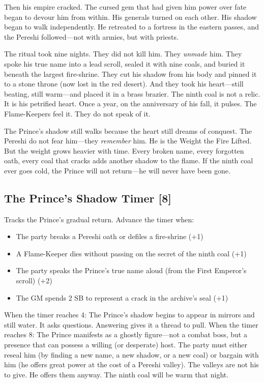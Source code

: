 Then his empire cracked. The cursed gem that had given him power over fate began to devour him from within. His generals turned on each other. His shadow began to walk independently. He retreated to a fortress in the eastern passes, and the Pereshi followed---not with armies, but with priests.

The ritual took nine nights. They did not kill him. They \textit{unmade} him. They spoke his true name into a lead scroll, sealed it with nine coals, and buried it beneath the largest fire-shrine. They cut his shadow from his body and pinned it to a stone throne (now lost in the red desert). And they took his heart---still beating, still warm---and placed it in a brass brazier. The ninth coal is not a relic. It is his petrified heart. Once a year, on the anniversary of his fall, it pulses. The Flame-Keepers feel it. They do not speak of it.

The Prince's shadow still walks because the heart still dreams of conquest. The Pereshi do not fear him---they \textit{remember} him. He is the Weight the Fire Lifted. But the weight grows heavier with time. Every broken name, every forgotten oath, every coal that cracks adds another shadow to the flame. If the ninth coal ever goes cold, the Prince will not return---he will never have been gone.

\subsection*{The Prince's Shadow Timer [8]}
Tracks the Prince's gradual return. Advance the timer when:
\begin{itemize}
  \item The party breaks a Pereshi oath or defiles a fire-shrine (+1)
  \item A Flame-Keeper dies without passing on the secret of the ninth coal (+1)
  \item The party speaks the Prince's true name aloud (from the First Emperor's scroll) (+2)
  \item The GM spends 2 SB to represent a crack in the archive's seal (+1)
\end{itemize}
When the timer reaches 4: The Prince's shadow begins to appear in mirrors and still water. It asks questions. Answering gives it a thread to pull. When the timer reaches 8: The Prince manifests as a ghostly figure---not a combat boss, but a presence that can possess a willing (or desperate) host. The party must either reseal him (by finding a new name, a new shadow, or a new coal) or bargain with him (he offers great power at the cost of a Pereshi valley). The valleys are not his to give. He offers them anyway. The ninth coal will be warm that night.

